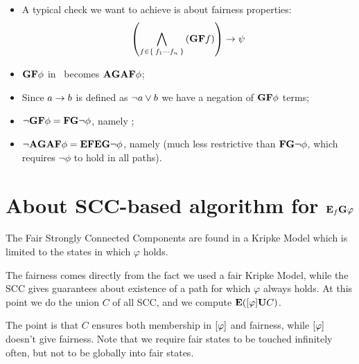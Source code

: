 \documentclass[a3paper]{article}
\begin{document}
            \begin{itemize}

            \item   A typical check we want to achieve is about fairness
                    properties:
                    \[
                    \left(
                        \bigwedge_{f \in \Set{ f_1 \cdots f_n }}^{}\left({\mathcal{\sf \bf G}\mathcal{\sf \bf F}f}\right)
                    \right)
                    \rightarrow \psi
                    \]

            \item   $\mathcal{\sf \bf G}\mathcal{\sf \bf F}\phi$ in \CTL\ becomes $\mathcal{\mathcal{\sf \bf A}}{\mathcal{\sf \bf G}\mathcal{\mathcal{\sf \bf A}}{\mathcal{\sf \bf F}\phi}}$;

            \item   Since $a \rightarrow b$ is defined as $\neg a \vee b$ we
                    have a negation of $\mathcal{\sf \bf G}\mathcal{\sf \bf F}\phi$ terms;

            \item   $\neg \mathcal{\sf \bf G}\mathcal{\sf \bf F}\phi = \mathcal{\sf \bf F}\mathcal{\sf \bf G}\neg \phi$, namely
                    ;

            \item   $\neg \mathcal{\mathcal{\sf \bf A}}{\mathcal{\sf \bf G}\mathcal{\mathcal{\sf \bf A}}{\mathcal{\sf \bf F}\phi}} = \mathcal{\mathcal{\sf \bf E}}{\mathcal{\sf \bf F}\mathcal{\mathcal{\sf \bf E}}{\mathcal{\sf \bf G}\neg \phi}}$, namely
                     (much less restrictive than $\mathcal{\sf \bf F}\mathcal{\sf \bf G}\neg
                    \phi$, which requires $\neg \phi$ to hold in all
                    paths).

            \end{itemize}

    \section{About SCC-based algorithm for $\mathcal{\mathcal{\sf \bf E}}_{f}{\mathcal{\sf \bf G}\varphi}$}

        The Fair Strongly Connected Components are found in a Kripke Model
        which is limited to the states in which $\varphi$ holds.

        The fairness comes directly from the fact we used a fair Kripke
        Model, while the SCC gives guarantees about existence of a path
        for which $\varphi$ always holds. At this point we do the union
        $C$ of all SCC, and we compute $\mathcal{\mathcal{\sf \bf E}}{({\left[{\varphi}\right]}\mathcal{\sf \bf U}{C})}$.

        The point is that $C$ ensures both membership in $\left[{\varphi}\right]$
        and fairness, while $\left[{\varphi}\right]$ doesn't give fairness. Note
        that we require fair states to be touched infinitely often, but
        not to be globally into fair states.
\end{document}
